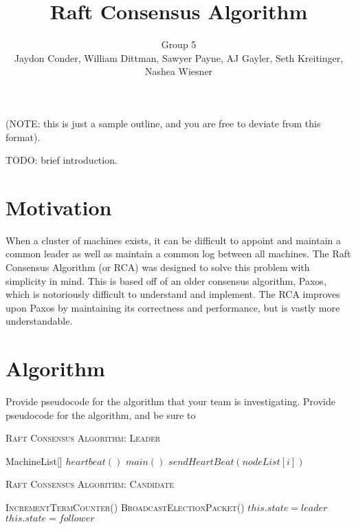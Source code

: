 \documentclass[11pt]{article}
\title{Raft Consensus Algorithm}
\author{Group 5 \\ 
\small{Jaydon Conder, William Dittman, Sawyer Payne, AJ Gayler, Seth Kreitinger, Nashea Wiesner}}
\begin{document}
\maketitle

(NOTE: this is just a sample outline, and you are free to deviate from this format).

TODO: brief introduction.

\section{Motivation}
When a cluster of machines exists, it can be difficult to appoint and maintain a common leader as well as maintain a common log between all machines. The Raft Consensus Algorithm (or RCA) was designed to solve this problem with simplicity in mind. This is based off of an older consensus algorithm, Paxos, which is notoriously difficult to understand and implement. The RCA improves upon Paxos by maintaining its correctness and performance, but is vastly more understandable. 

\section{Algorithm}
Provide pseudocode for the algorithm that your team is investigating.  Provide pseudocode for the algorithm, and be sure to 

\begin{algorithm}[H]\caption{\textsc{Raft Consensus Algorithm: Leader}}
 \begin{algorithmic}[1]
    MachineList[] 
	\State $heartbeat () $
	\State $main() $
  {} 
   	\State $sendHeartBeat( nodeList[i]) $  
   \EndFor	{}
   \EndFunction
    {}
   \EndFunction
 \end{algorithmic}
\end{algorithm}

\begin{algorithm}[H]\caption{\textsc{Raft Consensus Algorithm: Candidate}}
 \begin{algorithmic}[1]
 \State \textsc{IncrementTermCounter()} 
 \State \textsc{BroadcastElectionPacket()} 
  {}
	\State $this.state = leader $ 
 \EndFunction{\newline}
  {}
 	\State $this.state = follower $ 
 \EndFunction
\end{algorithmic}
\end{algorithm}
\end{document}
